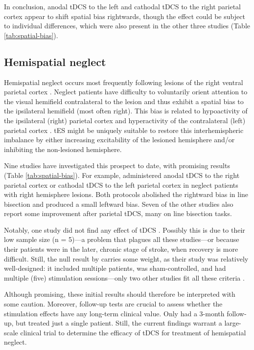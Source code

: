 \documentclass[11pt,english,]{memoir}
\begin{document}
In conclusion, anodal tDCS to the left and cathodal tDCS to the right parietal cortex appear to shift spatial bias rightwards, though the effect could be subject to individual differences, which were also present in the other three studies (Table \ref{tab:spatial-bias}).

\hypertarget{hemispatial-neglect}{%
\subsection{Hemispatial neglect}\label{hemispatial-neglect}}

Hemispatial neglect occurs most frequently following lesions of the right ventral parietal cortex \autocite{Vallar1986}. Neglect patients have difficulty to voluntarily orient attention to the visual hemifield contralateral to the lesion \autocite{Heilman2012} and thus exhibit a spatial bias to the ipsilateral hemifield (most often right). This bias is related to hypoactivity of the ipsilateral (right) parietal cortex and hyperactivity of the contralateral (left) parietal cortex \autocite{Corbetta2005}. tES might be uniquely suitable to restore this interhemispheric imbalance by either increasing excitability of the lesioned hemisphere and/or inhibiting the non-lesioned hemisphere.

Nine studies have investigated this prospect to date, with promising results (Table \ref{tab:spatial-bias}). For example, \textcite{Sparing2009} administered anodal tDCS to the right parietal cortex or cathodal tDCS to the left parietal cortex in neglect patients with right hemisphere lesions. Both protocols abolished the rightward bias in line bisection and produced a small leftward bias. Seven of the other studies also report some improvement after parietal tDCS, many on line bisection tasks.

Notably, one study did not find any effect of tDCS \autocite{Smit2015}. Possibly this is due to their low sample size (n = 5)---a problem that plagues all these studies---or because their patients were in the later, chronic stage of stroke, when recovery is more difficult. Still, the null result by \textcite{Smit2015} carries some weight, as their study was relatively well-designed: it included multiple patients, was sham-controlled, and had multiple (five) stimulation sessions---only two other studies fit all these criteria \autocites{Ladavas2015}{Yi2016}.

Although promising, these initial results should therefore be interpreted with some caution. Moreover, follow-up tests are crucial to assess whether the stimulation effects have any long-term clinical value. Only \textcite{Brem2014} had a 3-month follow-up, but treated just a single patient. Still, the current findings warrant a large-scale clinical trial to determine the efficacy of tDCS for treatment of hemispatial neglect.
\end{document}
